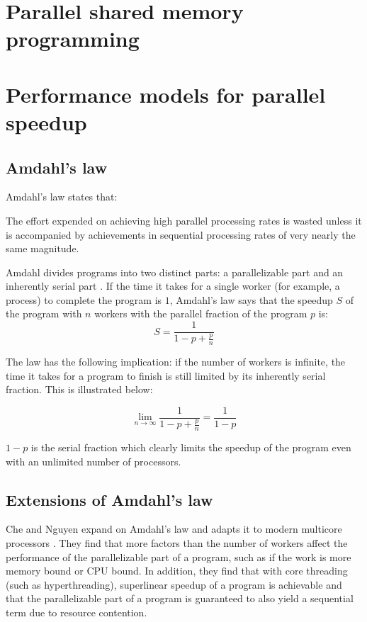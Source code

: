 \section{Parallel shared memory programming}

\section{Performance models for parallel speedup}

\subsection{Amdahl's law}
Amdahl's law \cite{amdahl_2013_computer_caaal} states that:
\begin{displayquote}
The effort expended on achieving high parallel processing rates is wasted unless it is
accompanied by achievements in sequential processing rates of very nearly the same magnitude.
\end{displayquote}

Amdahl divides programs into two distinct parts: a parallelizable part and an inherently
serial part
\cite[p. 13]{herlihy_2012_art_taomprr}.
If the time it takes for a single worker (for example, a process) to complete the program is $1$, Amdahl's law says
that the speedup $S$ of the program with $n$ workers with the parallel fraction of the program $p$ is:
\begin{displaymath}
  S = \frac{1}{1 - p + \frac{p}{n}}
  \label{amdahl}
\end{displaymath}

The law has the following implication: if the number of workers is infinite, the time it takes for a program to finish is still
limited by its inherently serial fraction. This is illustrated below:

\begin{displaymath}
  \lim_{n \to \infty} \frac{1}{1 - p + \frac{p}{n}} = \frac{1}{1 - p}
  \label{amdahl_lim}
\end{displaymath}

$1-p$ is the serial fraction which clearly limits the speedup of the program even with an unlimited number of processors.

\subsection{Extensions of Amdahl's law}
Che and Nguyen expand on Amdahl's law and adapts it to modern multicore processors \cite{che_2014_amdahl_alfmmp}. They find that
more factors than the number of workers affect the performance of the parallelizable part of a program, such as if the work is
more memory bound or CPU bound. In addition, they find that with core threading (such as hyperthreading), superlinear speedup of a
program is achievable and that the parallelizable part of a program is guaranteed to also yield a sequential term due to resource
contention.

